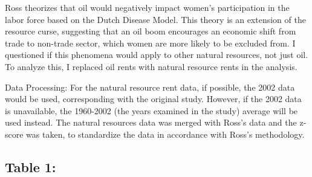 \documentclass[12pt,letterpaper]{article}
\begin{document}
\vspace{.5cm}

\noindent Ross theorizes that oil would negatively impact women's participation in the labor force based on the Dutch Disease Model. This theory is an extension of the resource curse, suggesting that an oil boom encourages an economic shift from trade to non-trade sector, which women are more likely to be excluded from. I questioned if this phenomena would apply to other natural resources, not just oil. To analyze this, I replaced oil rents with natural resource rents in the analysis. 

\vspace{.5cm}

\noindent Data Processing: For the natural resource rent data, if possible, the 2002 data would be used, corresponding with the original study. However, if the 2002 data is unavailable, the 1960-2002 (the years examined in the study) average will be used instead. The natural resources data was merged with Ross's data and the z-score was taken, to standardize the data in accordance with Ross's methodology.

\vspace{.5cm}



\subsection*{Table 1:}


\end{document}
